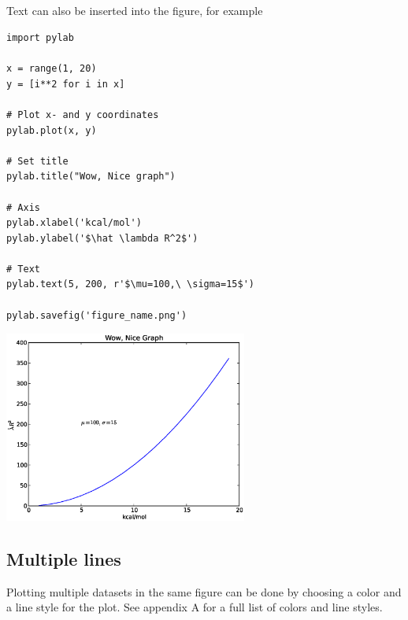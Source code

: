 \documentclass{article}
\begin{document}
\subsection*{}

Text can also be inserted into the figure, for example

\begin{multicols}{2}

\begin{lstlisting}
import pylab

x = range(1, 20)
y = [i**2 for i in x]

# Plot x- and y coordinates
pylab.plot(x, y)

# Set title
pylab.title("Wow, Nice graph")

# Axis
pylab.xlabel('kcal/mol')
pylab.ylabel('$\hat \lambda R^2$')

# Text
pylab.text(5, 200, r'$\mu=100,\ \sigma=15$')

pylab.savefig('figure_name.png')
\end{lstlisting}
\columnbreak
\includegraphics[width=0.6\textwidth]{py/figure_title_text.eps}
\end{multicols}



\newpage
\subsection{Multiple lines}

Plotting multiple datasets in the same figure
can be done by choosing a color and
a line style for the plot.
See appendix A for a full list of
colors and line styles.
\end{document}
